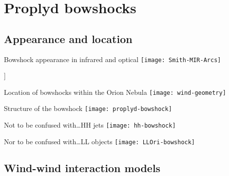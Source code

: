 \documentclass[presentation]{beamer}
\begin{document}
{
  \begin{frame}[plain]
  \end{frame}
}
{
  \begin{frame}[plain]
  \end{frame}
}



\section{Proplyd bowshocks}

\subsection{Appearance and location}
\begin{frame}{Bowshock appearance in infrared and optical}
  \texttt{[image: Smith-MIR-Arcs]}
  \par
  \tiny
  \quad 
  [Smith et al.\@ 2005]]
\end{frame}

\begin{frame}{Location of bowshocks within the Orion Nebula}
  \texttt{[image: wind-geometry]}
  \par
  \tiny
\end{frame}

\begin{frame}{Structure of the bowshock}
  \texttt{[image: proplyd-bowshock]}
\end{frame}
\begin{frame}{Not to be confused with\dots HH jets}
  \texttt{[image: hh-bowshock]}
\end{frame}
\begin{frame}{Nor to be confused with\dots LL objects}
  \texttt{[image: LLOri-bowshock]}
\end{frame}

\subsection{Wind-wind interaction models}
\end{document}
